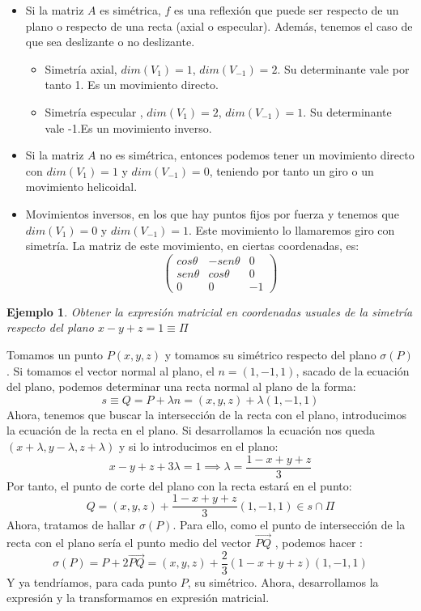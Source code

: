 \documentclass[11pt, a4paper]{article}
\makeatletter
\newif\IfInSansMode
\let\oldsf\sffamily
\renewcommand*{\sffamily}{\oldsf\mathversion{sans}\InSansModetrue}
\let\oldnorm\normalfont
\renewcommand*{\normalfont}{\oldnorm\InSansModefalse\mathversion{normal}}
\renewenvironment{proof}[1][\proofname] {\vspace{-15pt}\par\pushQED{\qed}\normalfont\topsep6\p@\@plus6\p@\relax\trivlist\item[\hskip\labelsep\it#1\@addpunct{.}]\ignorespaces}{\popQED\endtrivlist\@endpefalse}
\renewcommand{\vec}{\overrightarrow}
\renewenvironment{proof}[1][\proofname] {\par\pushQED{\qed}\normalfont\topsep6\p@\@plus6\p@\relax\trivlist\item[\hskip\labelsep\itshape\sffamily#1\@addpunct{.}]\ignorespaces}{\popQED\endtrivlist\@endpefalse}
\theoremstyle{theorem-style}
\theoremstyle{definition-style}
\theoremstyle{remark-style}
\theoremstyle{example-style}
\newtheorem{ejemplo}{Ejemplo}[section]
\makeatother
\begin{document}
\begin{itemize}
\item Si la matriz $A$ es simétrica, $f$ es una reflexión que puede ser respecto de un plano o respecto de una recta (axial o especular). Además, tenemos el caso de que sea deslizante o no deslizante.

  \begin{itemize}
  \item Simetría axial, $dim(V_1) = 1$, $dim(V_{-1}) =2$. Su determinante vale por tanto 1. Es un movimiento directo.
  \item Simetría especular , $dim(V_1) = 2$, $dim(V_{-1}) =1$. Su determinante vale -1.Es un movimiento inverso.
  \end{itemize}

\item Si la matriz $A$ no es simétrica, entonces podemos tener un movimiento directo con $dim(V_1) = 1$ y $dim(V_{-1})=0$, teniendo por tanto un giro o un movimiento helicoidal.
  
\item Movimientos inversos, en los que hay puntos fijos por fuerza y tenemos que $dim(V_1) = 0$ y $dim(V_{-1}) = 1$. Este movimiento lo llamaremos giro con simetría. La matriz de este movimiento, en ciertas coordenadas, es:
  \[
    \begin{pmatrix}
      cos \theta & -sen\theta  & 0\\
      sen\theta & cos\theta  & 0\\
      0 & 0 & -1
    \end{pmatrix} 
  \]
\end{itemize}

\begin{ejemplo}
  Obtener la expresión matricial en coordenadas usuales de la simetría respecto del plano $x-y+z = 1\equiv \Pi$
\end{ejemplo}
\begin{proof}[Solución:]
  Tomamos un punto $P(x,y,z)$ y tomamos su simétrico respecto del plano $\sigma(P)$. Si tomamos el vector normal al plano, el $n=(1,-1,1)$, sacado de la ecuación del plano, podemos determinar una recta normal al plano de la forma:
  \[
    s\equiv Q = P + \lambda n = (x,y,z)+\lambda(1,-1,1)
  \]
  Ahora, tenemos que buscar la intersección de la recta con el plano, introducimos la ecuación de la recta en el plano. Si desarrollamos la ecuación nos queda $(x+\lambda,y-\lambda,z+\lambda)$ y si lo introducimos en el plano:
  \[
    x-y+z+3\lambda = 1 \implies \lambda = \frac{1-x+y+z}{3}
  \]
  Por tanto, el punto de corte del plano con la recta estará en el punto:
  \[
    Q = (x,y,z)+\frac{1-x+y+z}{3}(1,-1,1) \in s\cap \Pi
  \]
  Ahora, tratamos de hallar $\sigma(P)$. Para ello, como el punto de intersección de la recta con el plano sería el punto medio del vector $\vec{PQ}$ , podemos hacer :
  \[
    \sigma(P) = P + 2 \vec{PQ} = (x,y,z) + \dfrac{2}{3}(1-x+y+z)(1,-1,1)
  \]
  Y ya tendríamos, para cada punto $P$, su simétrico. Ahora, desarrollamos la expresión y la transformamos en expresión matricial.
\end{proof}
\end{document}
